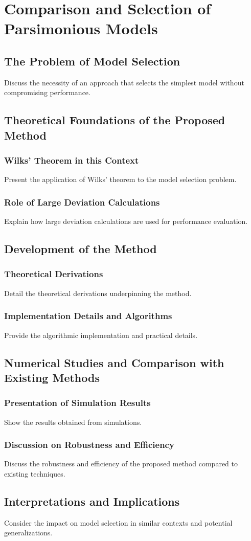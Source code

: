\chapter{Comparison and Selection of Parsimonious Models}
\chaptertoc{}


\section{The Problem of Model Selection}
Discuss the necessity of an approach that selects the simplest model without compromising performance.

\section{Theoretical Foundations of the Proposed Method}
\subsection{Wilks' Theorem in this Context}
Present the application of Wilks' theorem to the model selection problem.

\subsection{Role of Large Deviation Calculations}
Explain how large deviation calculations are used for performance evaluation.

\section{Development of the Method}
\subsection{Theoretical Derivations}
Detail the theoretical derivations underpinning the method.

\subsection{Implementation Details and Algorithms}
Provide the algorithmic implementation and practical details.

\section{Numerical Studies and Comparison with Existing Methods}
\subsection{Presentation of Simulation Results}
Show the results obtained from simulations.

\subsection{Discussion on Robustness and Efficiency}
Discuss the robustness and efficiency of the proposed method compared to existing techniques.

\section{Interpretations and Implications}
Consider the impact on model selection in similar contexts and potential generalizations.
